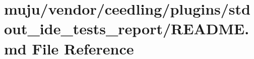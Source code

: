 \hypertarget{vendor_2ceedling_2plugins_2stdout__ide__tests__report_2_r_e_a_d_m_e_8md}{}\section{muju/vendor/ceedling/plugins/stdout\+\_\+ide\+\_\+tests\+\_\+report/\+R\+E\+A\+D\+ME.md File Reference}
\label{vendor_2ceedling_2plugins_2stdout__ide__tests__report_2_r_e_a_d_m_e_8md}
